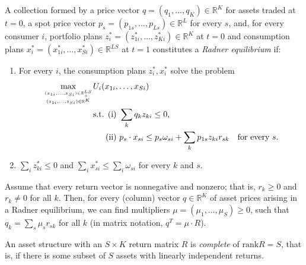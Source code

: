 \begin{defn}
    A collection formed by a price vector $q = (q_1, \dots, q_K) \in \mathbb{R}^{K}$ for assets traded at $t = 0$, a spot price vector $p_s = (p_{1s}, \dots, p_{Ls}) \in \mathbb{R}^{L}$ for every $s$, and, for every consumer $i$, portfolio plans $z^*_i = (z^*_{1i}, \dots, z^*_{Ki}) \in \mathbb{R}^{K}$ at $t = 0$ and consumption plans $x^*_i = (x^*_{1i}, \dots, x^*_{Si}) \in \mathbb{R}^{LS}$ at $t = 1$ constitutes a \emph{Radner equilibrium} if:
    \begin{enumerate}
        \item 
        For every $i$, the consumption plans $z^*_i, x^*_i$ solve the problem
        \begin{equation*}
            \begin{aligned}
                \max_{(x_{1i}, \dots, x_{Si}) \in \mathbb{R}^{LS}_+ \atop (z_{1i}, \dots, z_{Si}) \in \mathbb{R}^{K}} & U_i(x_{1i}, \dots, x_{Si})\\
                &\begin{aligned}
                    \text{s.t. (i) } & \sum_k q_k z_{ki} \leq 0, \\
                    \text{(ii) } & p_s \cdot x_{si} \leq p_s \omega_{si} + \sum_k p_{1s} z_{ki} r_{sk} \quad \text{for every } s.
                \end{aligned}
            \end{aligned}
        \end{equation*}

        \item 
        $\sum_i z^*_{ki} \leq 0$ and $\sum_i x^*_{si} \leq \sum_i \omega_{si}$ for every $k$ and $s$.
    \end{enumerate}
\end{defn}

\begin{prop}
    Assume that every return vector is nonnegative and nonzero; that is, $r_k \geq 0$ and $r_k \neq 0$ for all $k$. Then, for every (column) vector $q \in \mathbb{R}^{K}$ of asset prices arising in a Radner equilibrium, we can find multipliers $\mu = (\mu_1, \dots, \mu_S) \geq 0$, such that $q_k = \sum_s \mu_s r_{sk}$ for all $k$ (in matrix notation, $q^T = \mu \cdot R$).
\end{prop}

\begin{defn}
    An asset structure with an $S \times K$ return matrix $R$ is \emph{complete} of $\text{rank}R = S$, that is, if there is some subset of $S$ assets with linearly independent returns.
\end{defn}

